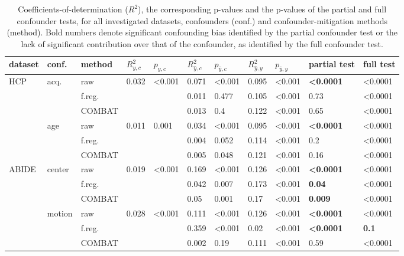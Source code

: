 \documentclass{article}
\begin{document}
\renewcommand{\arraystretch}{1.2}
\begin{table}
\centering
\begin{tabular}{lll|ll|ll|ll|ll} 
dataset & conf. & method & $R^2_{y, c}$ & $p_{y, c}$ & $R^2_{\hat{y}, c}$ & $p_{\hat{y}, c}$ & $R^2_{\hat{y}, y}$ & $p_{\hat{y}, y}$ & partial test & full test  \\
\hline
HCP & acq.  & raw      & 0.032 & <0.001 & 0.071 & <0.001  & 0.095 & <0.001 & \textbf{<0.0001} & <0.0001 \\
    &              & f.reg.    & & & 0.011 & 0.477 & 0.105  & <0.001  & 0.73 & <0.0001 \\
    &              & COMBAT    & & &0.013 & 0.4 & 0.122  & <0.001  & 0.65 & <0.0001\\
\hline
    & age   & raw       & 0.011 & 0.001  & 0.034 & <0.001  & 0.095  & <0.001 & \textbf{<0.0001} & <0.0001 \\
    &       & f.reg.    & & &0.004 & 0.052 & 0.114  & <0.001  & 0.2 & <0.0001 \\
    &       & COMBAT    & & &0.005 & 0.048 & 0.121 & <0.001 & 0.16 & <0.0001 \\
\hline
ABIDE   & center   & raw       & 0.019  & <0.001 &  0.169 & <0.001& 0.126     & <0.001 & \textbf{<0.0001} & <0.0001 \\
        &          & f.reg.    &  & &  0.042 & 0.007 & 0.173     & <0.001 & \textbf{0.04} & <0.0001 \\
        &          & COMBAT    &  & &  0.05 & 0.001 & 0.17     & <0.001 & \textbf{0.009} & <0.0001 \\
\hline
        & motion   & raw       & 0.028 & <0.001 & 0.111    &  <0.001 & 0.126    & <0.001 & \textbf{<0.0001} & <0.0001 \\
        &          & f.reg.    & & & 0.359    & <0.001  & 0.02   & <0.001 & \textbf{<0.0001} & \textbf{0.1} \\
        &          & COMBAT    & & &  0.002 & 0.19 & 0.111     & <0.001 & 0.59 & <0.0001 \\
    

\end{tabular}
\caption{\label{tab:unconditional-pvals} Coefficients-of-determination ($R^2$), the corresponding p-values and the p-values of the partial and full confounder tests, for all investigated datasets, confounders (conf.) and confounder-mitigation methods (method). Bold numbers denote significant confounding bias identified by the partial confounder test or the lack of significant contribution over that of the confounder, as identified by the full confounder test.}
\end{table}
\end{document}
